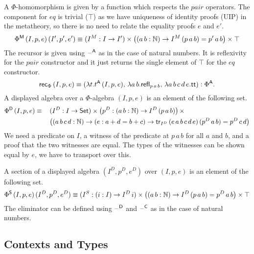 \documentclass[acmsmall,screen]{acmart}
\begin{document}
A $\Phi$-homomorphism is given by a function which respects the
$\mathit{pair}$ operators. The component for $\mathit{eq}$ is trivial ($\top$)
as we have uniqueness of identity proofs (UIP) in the metatheory, so
there is no need to relate the equality proofs $e$ and $e'$.
\[
\Phi^{\mathsf{M}}\,(I,p,e)\,(I',p',e')\equiv (I^M:I\rightarrow I')\times\big((a\,b:\mathbb{N})\rightarrow I^M\,(p\,a\,b)=p'\,a\,b\big)\times\top
\]
The recursor is given using $\mathord{\hspace{1pt}\text{--}\hspace{1pt}}^{\mathsf{A}}$ as in the case of natural
numbers. It is reflexivity for the $\mathit{pair}$ constructor and it
just returns the single element of $\top$ for the $\mathit{eq}$
constructor.
\[
\mathsf{rec}_\Phi\,(I,p,e) \equiv (\lambda t.t^{\mathsf{A}}\,(I,p,e),\, \lambda a\,b.\mathsf{refl}_{p\,a\,b},\, \lambda a\,b\,c\,d\,e.\mathsf{tt}):\Phi^{\mathsf{A}}.
\]
A displayed algebra over a $\Phi$-algebra $(I,p,e)$ is an element of
the following set.
\begin{alignat*}{5}
  & \Phi^{\mathsf{D}}\,(I,p,e) \equiv\, &&  (I^D:I\rightarrow\mathsf{Set})\times\big(p^D:(a\,b:\mathbb{N})\rightarrow I^D\,(p\,a\,b)\big)\,\times \\
  & && \big((a\,b\,c\,d:\mathbb{N})\rightarrow(e:a+d=b+c)\rightarrow\mathsf{tr}_{I^D}\,(e\,a\,b\,c\,d\,e)\,(p^D\,a\,b)=p^D\,c\,d\big)
\end{alignat*}
We need a predicate on $I$, a witness of the predicate at $p\,a\,b$
for all $a$ and $b$, and a proof that the two witnesses are equal. The
types of the witnesses can be shown equal by $e$, we have to transport
over this.

A section of a displayed algebra $(I^D,p^D,e^D)$ over $(I,p,e)$ is an
element of the following set.
\[
\Phi^{\mathsf{S}}\,(I,p,e)\,(I^D,p^D,e^D)\equiv (I^S:(i:I)\rightarrow I^D\,i)\times\big((a\,b:\mathbb{N})\rightarrow I^D\,(p\,a\,b)=p^D\,a\,b\big)\times\top
\]
The eliminator can be defined using $\mathord{\hspace{1pt}\text{--}\hspace{1pt}}^{\mathsf{D}}$ and $\mathord{\hspace{1pt}\text{--}\hspace{1pt}}^{\mathsf{C}}$ as in
the case of natural numbers.

\subsection{Contexts and Types}
\label{sec:conty}
\end{document}
